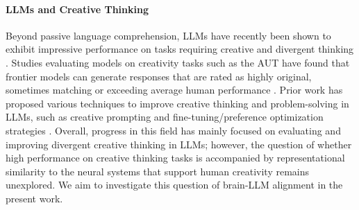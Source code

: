 \paragraph{LLMs and Creative Thinking}
Beyond passive language comprehension, LLMs have recently been shown to exhibit impressive performance on tasks requiring creative and divergent thinking \citep{ismayilzada2024creativity}. Studies evaluating models on creativity tasks such as the AUT have found that frontier models can generate responses that are rated as highly original, sometimes matching or exceeding average human performance \citep{goes2023pushing, stevenson2022putting, bellemare2026divergent}. Prior work has proposed various techniques to improve creative thinking and problem-solving in LLMs, such as creative prompting \citep{nguyen2025divergent, tian2024macgyver, lu2025benchmarking} and fine-tuning/preference optimization strategies \citep{puerto2025fine, ismayilzada-etal-2025-creative}. Overall, progress in this field has mainly focused on evaluating and improving divergent creative thinking in LLMs; however, the question of whether high performance on creative thinking tasks is accompanied by representational similarity to the neural systems that support human creativity remains unexplored. We aim to investigate this question of brain-LLM alignment in the present work.